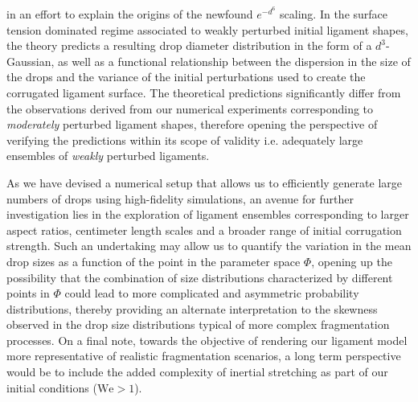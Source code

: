 in an effort to explain the origins of the newfound $e^{-d^6}$ scaling.
In the surface tension dominated regime associated to weakly perturbed initial ligament shapes, 
the theory predicts a resulting drop diameter distribution in the form of a $d^3$- Gaussian, 
as well as a functional relationship between the dispersion in the size of the drops and the 
variance of the initial perturbations used to create the corrugated ligament surface. 
The theoretical predictions significantly differ from the observations derived from our numerical experiments
corresponding to \textit{moderately} perturbed ligament shapes, therefore opening the perspective
of verifying the predictions within its scope of validity i.e. adequately large ensembles of \textit{weakly} perturbed ligaments.

As we have devised a numerical setup that allows us to efficiently generate
large numbers of drops using high-fidelity simulations, an avenue for further investigation
lies in the exploration of ligament ensembles corresponding to 
larger aspect ratios, centimeter length scales and a broader range of initial corrugation strength. 
Such an undertaking may allow us to quantify the variation in the mean drop sizes as a function of the 
point in the parameter space $\Phi$, opening up the possibility that the combination of size distributions
characterized by different points in $\Phi$ could lead to more complicated and asymmetric probability
distributions, thereby providing an alternate interpretation to the skewness observed in the drop size 
distributions typical of more complex fragmentation processes. 
On a final note, towards the objective of rendering our ligament model more representative of  
realistic fragmentation scenarios, a long term perspective would be to include the added complexity
of inertial stretching as part of our initial conditions ($\textrm{We} > 1$).  
